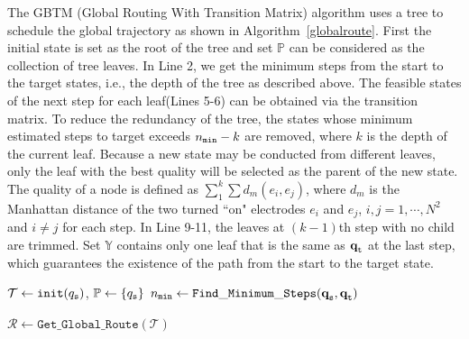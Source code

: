 \documentclass[conference, onecolumn]{IEEEtran}
\begin{document}
The GBTM (Global Routing With Transition Matrix) algorithm uses a tree to schedule the global trajectory as shown in Algorithm~\ref{globalroute}. First the initial state is set as the root of the tree and set $\mathbb{P} $ can be considered as the collection of tree leaves. In Line 2, we get the minimum steps from the start to the target states, i.e., the depth of the tree as described above. The feasible states of the next step for each leaf(Lines 5-6) can be obtained via the transition matrix. To reduce the redundancy of the tree, the states whose minimum estimated steps to target exceeds $n_{\tt min}-k$ are removed, where $k$ is the depth of the current leaf. Because a new state may be conducted from different leaves, only the leaf with the best quality will be selected as the parent of the new state. The quality of a node is defined as $\sum_{1}^{k} \sum d_m(e_i,e_j)$, where $d_m$ is the Manhattan distance of the two turned ``on" electrodes $e_i$ and $e_j$, $i, j=1,\cdots, N^2$ and $i\neq j$ for each step. In Line 9-11, the leaves at $(k-1)$th step with no child are trimmed. Set $\mathbb{Y}$ contains only one leaf that is the same as $\textbf{q}_{\tt t}$ at the last step, which guarantees the existence of the path from the start to the target state.

\begin{algorithm}[ht!]
	\caption {${{\tt GRTM}}$}
	\label{globalroute}
	\DontPrintSemicolon
	\SetAlgoVlined
	\BlankLine	
	$\mathcal{T}  \gets \mathtt{init}(q_{\tt s}) $,	$\mathbb{P}  \gets \{q_{\tt s}\} $\;
	$n_{\tt min} \gets \mathtt{Find\_Minimum\_Steps}(\textbf{q}_{\tt s},\textbf{q}_{\tt t}) $\;	
	
	$\mathcal{R} \gets \mathtt{Get\_Global\_Route}(\mathcal{T})$	
\end{algorithm}
\end{document}
